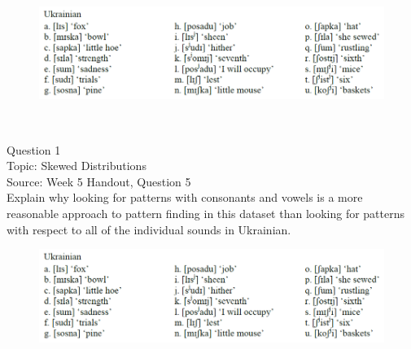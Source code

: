 \documentclass[12pt]{article}
\begin{document}
\begin{figure}[H]
\includegraphics{../images/ukrainian.png}
\end{figure}

\newpage

\begin{center}
\textbf{{\color{red}{\HUGE END OF EXAM}}}\\

\end{center}
\newpage

\begin{center}
\textbf{{\color{blue}{\HUGE START OF EXAM\\}}}

\textbf{{\color{blue}{\HUGE Student ID: 99531\\}}}

\textbf{{\color{blue}{\HUGE 4:10\\}}}

\end{center}
\newpage

{\large Question 1}\\

Topic: Skewed Distributions\\
Source: Week 5 Handout, Question 5\\

Explain why looking for patterns with consonants and vowels is a more reasonable approach to pattern finding in this dataset than looking for patterns with respect to all of the individual sounds in Ukrainian.\\

\begin{figure}[H]
\includegraphics{../images/ukrainian.png}
\end{figure}
\end{document}
